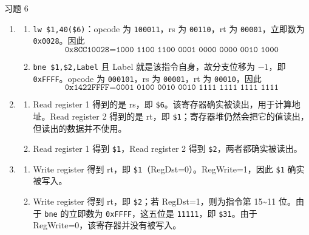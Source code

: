\begin{problem}
    习题 6
    \begin{solution}
        \begin{enumerate}
            \item[\textbf{1)}] 
            \begin{enumerate}
                \item[\textbf{a)}] \texttt{lw \$1,40(\$6)}：opcode 为 \texttt{100011}，rs 为 \texttt{00110}，rt 为 \texttt{00001}，立即数为 \texttt{0x0028}。因此
                $$
                \texttt{0x8CC10028} = \texttt{1000 1100 1100 0001 0000 0000 0010 1000}
                $$
                \item[\textbf{b)}] \texttt{bne \$1,\$2,Label} 且 Label 就是该指令自身，故分支位移为 $-1$，即 \texttt{0xFFFF}。opcode 为 \texttt{000101}，rs 为 \texttt{00001}，rt 为 \texttt{00010}，因此
                $$
                \texttt{0x1422FFFF} = \texttt{0001 0100 0010 0010 1111 1111 1111 1111}
                $$
            \end{enumerate}

            \item[\textbf{2)}] 
            \begin{enumerate}
                \item[\textbf{a)}] Read register 1 得到的是 rs，即 \texttt{\$6}。该寄存器确实被读出，用于计算地址。Read register 2 得到的是 rt，即 \texttt{\$1}；寄存器堆仍然会把它的值读出，但读出的数据并不使用。
                \item[\textbf{b)}] Read register 1 得到 \texttt{\$1}，Read register 2 得到 \texttt{\$2}，两者都确实被读出。
            \end{enumerate}

            \item[\textbf{3)}] 
            \begin{enumerate}
                \item[\textbf{a)}] Write register 得到 rt，即 \texttt{\$1}（RegDst=0）。RegWrite=1，因此 \texttt{\$1} 确实被写入。
                \item[\textbf{b)}] Write register 得到 rt，即 \texttt{\$2}；若 RegDst=1，则为指令第 15\textasciitilde 11 位。由于 \texttt{bne} 的立即数为 \texttt{0xFFFF}，这五位是 \texttt{11111}，即 \texttt{\$31}。由于 RegWrite=0，该寄存器并没有被写入。
            \end{enumerate}


\end{enumerate}
\end{solution}
\end{problem}
